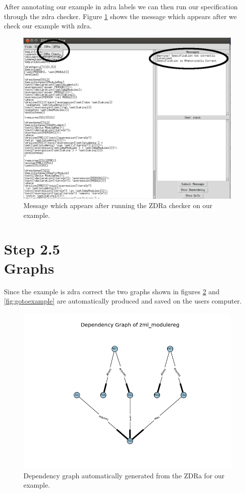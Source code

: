 After annotating our example in \gls{zdra} labels we can then run our
specification through the \gls{zdra} checker. Figure \ref{fig:zdracorrect} shows
the message which appears after we check our example with \gls{zdra}.

\begin{figure}[H]
\centering
\includegraphics[scale=0.3]{Figures/fullexample/zdracorrect.png}
\caption{Message which appears after running the ZDRa checker on our example. \label{fig:zdracorrect}}
\end{figure}

\section{Step 2.5\\Graphs}

Since the example is \gls{zdra} correct the two graphs shown in figures
\ref{fig:depexample} and \ref{fig:gotoexample} are automatically produced and
saved on the users computer.

\begin{figure}[H]
\centering
\includegraphics[scale=0.7]{Figures/fullexample/dp_fullexample.png}
\caption{Dependency graph automatically generated from the ZDRa for our example. \label{fig:depexample}}
\end{figure}

